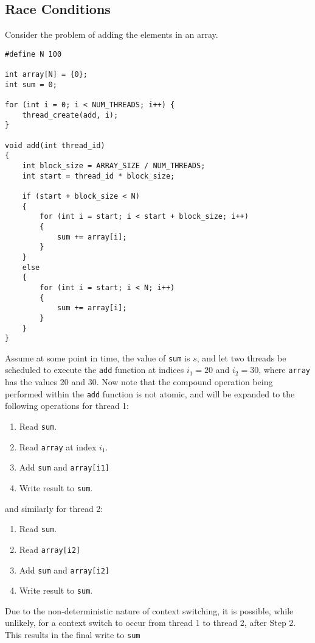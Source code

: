 \documentclass{article}
\begin{document}
\subsection{Race Conditions}
Consider the problem of adding the elements in an array.
\begin{verbatim}
#define N 100

int array[N] = {0};
int sum = 0;

for (int i = 0; i < NUM_THREADS; i++) {
    thread_create(add, i);
}

void add(int thread_id)
{
    int block_size = ARRAY_SIZE / NUM_THREADS;
    int start = thread_id * block_size;

    if (start + block_size < N)
    {
        for (int i = start; i < start + block_size; i++)
        {
            sum += array[i];
        }
    }
    else
    {
        for (int i = start; i < N; i++)
        {
            sum += array[i];
        }
    }
}
\end{verbatim}
Assume at some point in time, the value of \texttt{sum} is
\(s\), and let two threads be scheduled to execute the
\texttt{add} function at indices \(i_1 = 20\) and \(i_2 = 30\),
where \texttt{array} has the values 20 and 30. Now note that the
compound operation being performed within the \texttt{add}
function is not atomic, and will be expanded to the following
operations for thread 1:
\begin{enumerate}
    \item Read \texttt{sum}.
    \item Read \texttt{array} at index \(i_1\).
    \item Add \texttt{sum} and \texttt{array[i1]}
    \item Write result to \texttt{sum}.
\end{enumerate}
and similarly for thread 2:
\begin{enumerate}
    \item Read \texttt{sum}.
    \item Read \texttt{array[i2]}
    \item Add \texttt{sum} and \texttt{array[i2]}
    \item Write result to \texttt{sum}.
\end{enumerate}
Due to the non-deterministic nature of context switching, it is possible,
while unlikely, for a context switch to occur from thread 1 to thread 2,
after Step 2. This results in the final write to \texttt{sum}
\end{document}
